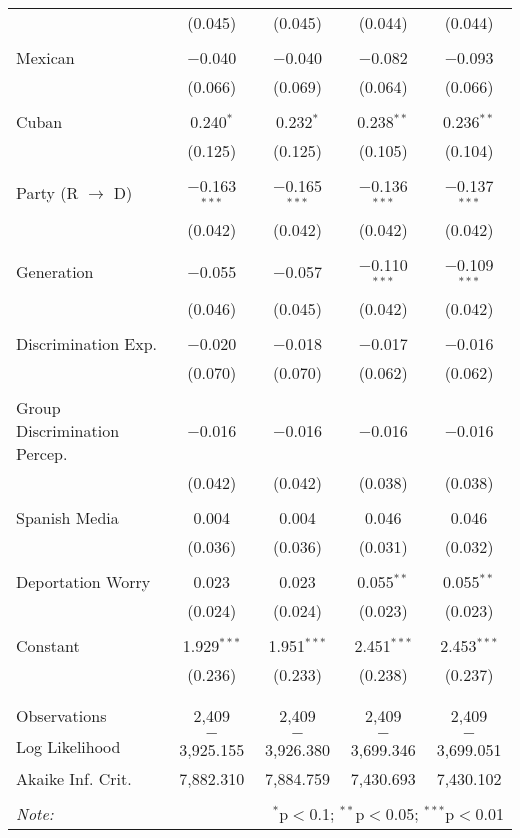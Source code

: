 \begin{table}[!htbp]
\begin{tabular}{@{\extracolsep{5pt}}lcccc}
  & (0.045) & (0.045) & (0.044) & (0.044) \\ 
  & & & & \\ 
 Mexican & $-$0.040 & $-$0.040 & $-$0.082 & $-$0.093 \\ 
  & (0.066) & (0.069) & (0.064) & (0.066) \\ 
  & & & & \\ 
 Cuban & 0.240$^{*}$ & 0.232$^{*}$ & 0.238$^{**}$ & 0.236$^{**}$ \\ 
  & (0.125) & (0.125) & (0.105) & (0.104) \\ 
  & & & & \\ 
 Party (R $\longrightarrow$ D) & $-$0.163$^{***}$ & $-$0.165$^{***}$ & $-$0.136$^{***}$ & $-$0.137$^{***}$ \\ 
  & (0.042) & (0.042) & (0.042) & (0.042) \\ 
  & & & & \\ 
 Generation & $-$0.055 & $-$0.057 & $-$0.110$^{***}$ & $-$0.109$^{***}$ \\ 
  & (0.046) & (0.045) & (0.042) & (0.042) \\ 
  & & & & \\ 
 Discrimination Exp. & $-$0.020 & $-$0.018 & $-$0.017 & $-$0.016 \\ 
  & (0.070) & (0.070) & (0.062) & (0.062) \\ 
  & & & & \\ 
 Group Discrimination Percep. & $-$0.016 & $-$0.016 & $-$0.016 & $-$0.016 \\ 
  & (0.042) & (0.042) & (0.038) & (0.038) \\ 
  & & & & \\ 
 Spanish Media & 0.004 & 0.004 & 0.046 & 0.046 \\ 
  & (0.036) & (0.036) & (0.031) & (0.032) \\ 
  & & & & \\ 
 Deportation Worry & 0.023 & 0.023 & 0.055$^{**}$ & 0.055$^{**}$ \\ 
  & (0.024) & (0.024) & (0.023) & (0.023) \\ 
  & & & & \\ 
 Constant & 1.929$^{***}$ & 1.951$^{***}$ & 2.451$^{***}$ & 2.453$^{***}$ \\ 
  & (0.236) & (0.233) & (0.238) & (0.237) \\ 
  & & & & \\ 
\hline \\[-1.8ex] 
Observations & 2,409 & 2,409 & 2,409 & 2,409 \\ 
Log Likelihood & $-$3,925.155 & $-$3,926.380 & $-$3,699.346 & $-$3,699.051 \\ 
Akaike Inf. Crit. & 7,882.310 & 7,884.759 & 7,430.693 & 7,430.102 \\ 
\hline 
\hline \\[-1.8ex] 
\textit{Note:}  & \multicolumn{4}{r}{$^{*}$p$<$0.1; $^{**}$p$<$0.05; $^{***}$p$<$0.01} \\ 
\end{tabular} 
\end{table} 
